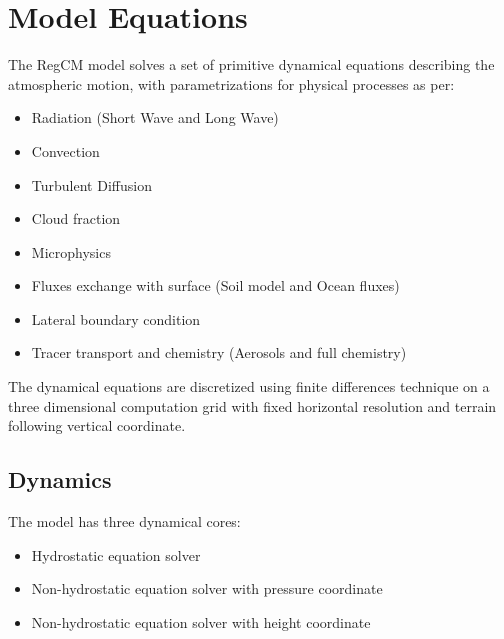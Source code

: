 
\newpage

\chapter{Model Equations}

The \ac{RegCM} model solves a set of primitive dynamical equations describing
the atmospheric motion, with parametrizations for physical processes as per:

\begin{itemize}
  \item Radiation (Short Wave and Long Wave)
  \item Convection
  \item Turbulent Diffusion
  \item Cloud fraction
  \item Microphysics
  \item Fluxes exchange with surface (Soil model and Ocean fluxes)
  \item Lateral boundary condition
  \item Tracer transport and chemistry (Aerosols and full chemistry)
\end{itemize}

The dynamical equations are discretized using finite differences technique
on a three dimensional computation grid with fixed horizontal resolution
and terrain following vertical coordinate.

\section{Dynamics}
The model has three dynamical cores:

\begin{itemize}
\item Hydrostatic equation solver
\item Non-hydrostatic equation solver with pressure coordinate
\item Non-hydrostatic equation solver with height coordinate
\end{itemize}

